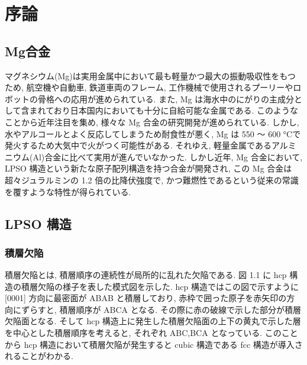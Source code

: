 \chapter{序論}


\section{Mg合金}
マグネシウム(Mg)は実用金属中において最も軽量かつ最大の振動吸収性をもつため, 航空機や自動車, 鉄道車両のフレーム, 工作機械で使用されるプーリーやロボットの骨格への応用が進められている. また,  Mg は海水中のにがりの主成分として含まれており日本国内においても十分に自給可能な金属である. このようなことから近年注目を集め, 様々な Mg 合金の研究開発が進められている. しかし,水やアルコールとよく反応してしまうため耐食性が悪く, Mg は 550 〜 600 °Cで発火するため大気中で火がつく可能性がある. それゆえ, 軽量金属であるアルミニウム(Al)合金に比べて実用が進んでいなかった.
しかし近年, Mg 合金において, LPSO 構造という新たな原子配列構造を持つ合金が開発され\cite{Th}, この Mg 合金は超々ジュラルミンの 1.2 倍の比降伏強度で, かつ難燃性であるという従来の常識を覆すような特性が得られている.


\section{LPSO 構造}
\subsection{積層欠陥}
積層欠陥とは, 積層順序の連続性が局所的に乱れた欠陥である. 図 1.1 に hcp 構造の積層欠陥の様子を表した模式図を示した. hcp 構造ではこの図で示すように [0001] 方向に最密面が ABAB と積層しており, 赤枠で囲った原子を赤矢印の方向にずらすと, 積層順序が ABCA となる. その際に赤の破線で示した部分が積層欠陥面となる. そして hcp 構造上に発生した積層欠陥面の上下の黄丸で示した層を中心とした積層順序を考えると, それぞれ ABC,BCA となっている. このことから hcp 構造において積層欠陥が発生すると cubic 構造である fcc 構造が導入されることがわかる.

